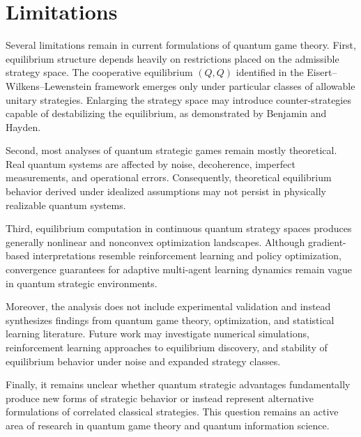\section{Limitations}

Several limitations remain in current formulations of quantum game theory. First, equilibrium structure depends heavily on restrictions placed on the admissible strategy space. The cooperative equilibrium $(Q,Q)$ identified in the Eisert--Wilkens--Lewenstein framework emerges only under particular classes of allowable unitary strategies. Enlarging the strategy space may introduce counter-strategies capable of destabilizing the equilibrium, as demonstrated by Benjamin and Hayden.

Second, most analyses of quantum strategic games remain mostly theoretical. Real quantum systems are affected by noise, decoherence, imperfect measurements, and operational errors. Consequently, theoretical equilibrium behavior derived under idealized assumptions may not persist in physically realizable quantum systems.

Third, equilibrium computation in continuous quantum strategy spaces produces generally nonlinear and nonconvex optimization landscapes. Although gradient-based interpretations resemble reinforcement learning and policy optimization, convergence guarantees for adaptive multi-agent learning dynamics remain vague in quantum strategic environments.

Moreover, the analysis does not include experimental validation and instead synthesizes findings from quantum game theory, optimization, and statistical learning literature. Future work may investigate numerical simulations, reinforcement learning approaches to equilibrium discovery, and stability of equilibrium behavior under noise and expanded strategy classes.

Finally, it remains unclear whether quantum strategic advantages fundamentally produce new forms of strategic behavior or instead represent alternative formulations of correlated classical strategies. This question remains an active area of research in quantum game theory and quantum information science.